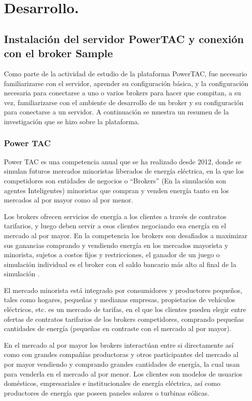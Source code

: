\chapter{Desarrollo.}
\section{Instalación del servidor PowerTAC y conexión con el broker Sample}

Como parte de la actividad de estudio de la plataforma PowerTAC, fue necesario familiarizarse con el servidor, aprender su configuración básica, y la configuración necesaria para conectarse a uno o varios brokers para hacer que compitan, a su vez, familiarizarse con el ambiente de desarrollo de un broker y su configuración para conectarse a un servidor. A continuación se muestra un resumen de la investigación que se hizo sobre la plataforma.
\subsection{Power TAC}

Power TAC es una competencia anual que se ha realizado desde 2012, donde se simulan futuros mercados minoristas liberados de energía eléctrica, en la que los competidores son entidades de negocios o ``Brokers'' (En la simulación son agentes Inteligentes) minoristas que compran y venden energía tanto en los mercados al por mayor como al por menor.

Los brokers ofrecen servicios de energía a los clientes a través de contratos tarifarios, y luego deben servir a esos clientes negociando esa energía en el mercado al por mayor. En la competencia los brokers son desafiados a maximizar sus ganancias comprando y vendiendo energía en los mercados mayorista y minorista, sujetos a costos fijos y restricciones, el ganador de un juego o simulación individual es el broker con el saldo bancario más alto al final de la simulación \cite{WKetterJCollinsyMdWeerdtThe2017PowerTAC}.

El mercado minorista está integrado por consumidores y productores pequeños, tales como hogares, pequeñas y medianas empresas, propietarios de vehículos eléctricos, etc. es un mercado de tarifas, en el que los clientes pueden elegir entre ofertas de contratos tarifarios de los brokers competidores, comprando pequeñas cantidades de energía (pequeñas en contraste con el mercado al por mayor).

En el mercado al por mayor los brokers interactúan entre si directamente así como con grandes compañías productoras y otros participantes del mercado al por mayor vendiendo y comprando grandes cantidades de energía, la cual usan para venderla en el mercado al por menor. Los clientes son modelos de usuarios domésticos, empresariales e institucionales de energía eléctrica, así como productores de energía que poseen paneles solares o turbinas eólicas.

